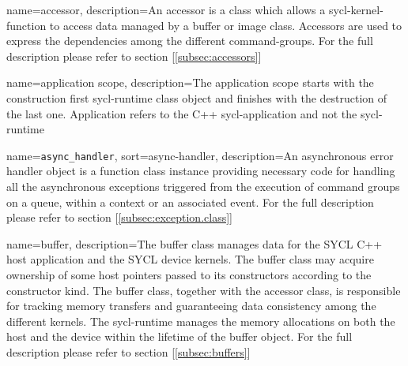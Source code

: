 



\makenoidxglossaries
\glstoctrue
{}
{
  name=accessor,
  description={An accessor is a class which allows a
               \gls{sycl-kernel-function} to access data managed by a \gls{buffer} or
               \gls{image} class. Accessors are used to express the dependencies
               among the different \glspl{command-group}. For the full
               description please refer to section [\ref{subsec:accessors}]}
}

{
  name={application scope},
  description={The application scope starts with the
               construction first \gls{sycl-runtime} class object and
               finishes with the destruction of the last one.
               Application refers to the C++ \gls{sycl-application} and not
               the \gls{sycl-runtime}}
}

{
  name={\texttt{async\string_handler}},
  sort=async-handler,
  description={An asynchronous error handler object is a function class instance
               providing necessary code for handling all the asynchronous
               exceptions triggered from the execution of command groups on a
               queue, within a context or an associated event. For the full
               description please refer to section [\ref{subsec:exception.class}]}
}

{
  name=buffer,
  description={The buffer class manages data for the SYCL C++ host
               application and the SYCL device kernels. The buffer class
               may acquire ownership of some host pointers passed to its
               constructors according to the constructor kind.
               \glspar
               The buffer class, together with the accessor class,
               is responsible for tracking memory transfers and guaranteeing
               data consistency among the different kernels.
               The \gls{sycl-runtime} manages the memory allocations
               on both the host and the \gls{device} within the
               lifetime of the buffer object. For the full
               description please refer to section [\ref{subsec:buffers}]}
}

